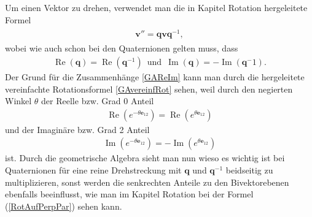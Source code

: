 Um einen Vektor zu drehen, verwendet man die in Kapitel Rotation hergeleitete Formel 
\begin{align} \label{QuatRotGA}
	\begin{split} 
		\mathbf{v}'' = \mathbf{qvq}^{-1},
	\end{split}
\end{align}
wobei wie auch schon bei den Quaternionen gelten muss, dass
\begin{align} \label{GAReIm}
	\operatorname{Re}(\mathbf{q}) = \operatorname{Re}(\mathbf{q}^{-1}) \enspace\text{und}\enspace \operatorname{Im}(\mathbf{q}) = -\operatorname{Im}(\mathbf{q}^-1).
\end{align}
Der Grund für die Zusammenhänge \eqref{GAReIm} kann man durch die hergeleitete vereinfachte Rotationsformel \eqref{GAvereinfRot} sehen, weil durch den negierten Winkel $\theta$ der Reelle bzw. Grad 0 Anteil
\begin{align}
	\operatorname{Re}(e^{-\theta \mathbf{e}_{12}}) = \operatorname{Re}(e^{\theta \mathbf{e}_{12}})
\end{align}
und der Imaginäre bzw. Grad 2 Anteil
\begin{align}
	\operatorname{Im}(e^{-\theta \mathbf{e}_{12}}) = -\operatorname{Im}(e^{\theta \mathbf{e}_{12}})
\end{align}
ist. Durch die geometrische Algebra sieht man nun wieso es wichtig ist bei Quaternionen für eine reine Drehstreckung mit $\mathbf{q}$ und $\mathbf{q}^{-1}$ beidseitig zu multiplizieren, sonst werden die senkrechten Anteile zu den Bivektorebenen ebenfalls beeinflusst, wie man im Kapitel Rotation bei der Formel (\ref{RotAufPerpPar}) sehen kann.
